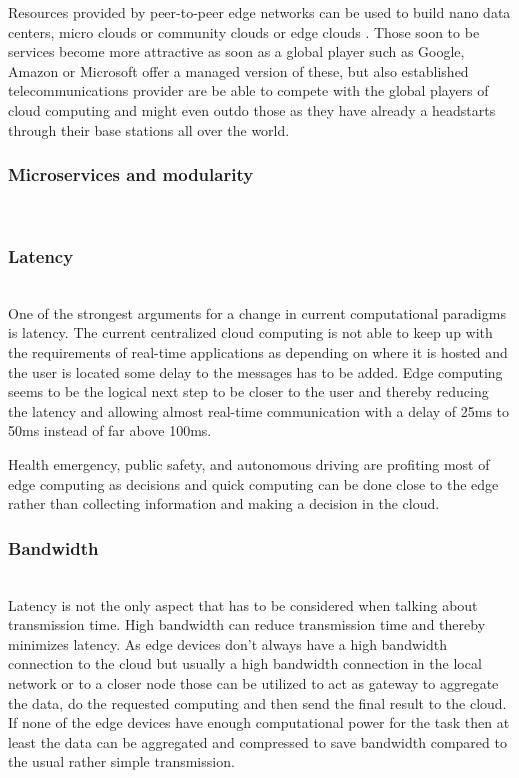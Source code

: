 Resources provided by peer-to-peer edge networks can be used to build nano data centers, micro clouds or community clouds or edge clouds . Those soon to be services become more attractive as soon as a global player such as Google, Amazon or Microsoft offer a managed version of these, but also established telecommunications provider are be able to compete with the global players of cloud computing and might even outdo those as they have already a headstarts through their base stations all over the world.

\subsubsection{Microservices and modularity}\hspace*{\fill} \\

\subsubsection{Latency}\hspace*{\fill} \\
One of the strongest arguments for a change in current computational paradigms is latency. The current centralized cloud computing is not able to keep up with the requirements of real-time applications as depending on where it is hosted and the user is located some delay to the messages has to be added.
Edge computing seems to be the logical next step to be closer to the user and thereby reducing the latency and allowing almost real-time communication with a delay of 25ms to 50ms instead of far above 100ms.

Health emergency, public safety, and autonomous driving are profiting most of edge computing as decisions and quick computing can be done close to the edge rather than collecting information and making a decision in the cloud.

\subsubsection{Bandwidth}\hspace*{\fill} \\
Latency is not the only aspect that has to be considered when talking about transmission time. High bandwidth can reduce transmission time and thereby minimizes latency.
As edge devices don’t always have a high bandwidth connection to the cloud but usually a high bandwidth connection in the local network or to a closer node those can be utilized to act as gateway to aggregate the data, do the requested computing and then send the final result to the cloud. If none of the edge devices have enough computational power for the task then at least the data can be aggregated and compressed to save bandwidth compared to the usual rather simple transmission.

